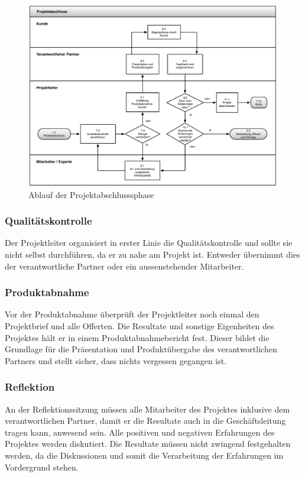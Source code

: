 \clearpage

\begin{figure}[h!tbp]
\begin{center}
\includegraphics[width=0.99\textwidth,angle=0]{./bilder/loesung/02_03_projektabschluss.pdf}
\caption[Ablauf der Projektabschlusssphase]{Ablauf der Projektabschlusssphase\footnotemark}
\label{pic:02_03_projektabschluss}
\end{center}
\end{figure}

\clearpage

\subsubsection{Qualitätskontrolle}
Der Projektleiter organisiert in erster Linie die Qualitätskontrolle und sollte
sie nicht selbst durchführen, da er zu nahe am Projekt ist. Entweder übernimmt
dies der verantwortliche Partner oder ein aussenstehender Mitarbeiter.

\subsubsection{Produktabnahme}
Vor der Produktabnahme überprüft der Projektleiter noch einmal den Projektbrief
und alle Offerten. Die Resultate und sonstige Eigenheiten des Projektes hält er
in einem Produktabnahmebericht fest. Dieser bildet die Grundlage für die
Präsentation und Produktübergabe des verantwortlichen Partners und stellt
sicher, dass nichts vergessen gegangen ist.

\subsubsection{Reflektion}
An der Reflektionssitzung müssen alle Mitarbeiter des Projektes inklusive dem
verantwortlichen Partner, damit er die Resultate auch in die Geschäftsleitung 
tragen kann, anwesend sein. Alle positiven und negativen Erfahrungen des Projektes
werden diskutiert. Die Resultate müssen nicht zwingend festgehalten werden,
da die Diskussionen und somit die Verarbeitung der Erfahrungen im Vordergrund 
stehen.